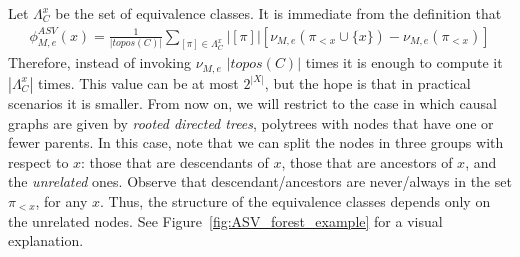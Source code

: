 \newcommand{\equivalenceClasses}{\Lambda_C^x}

Let $\equivalenceClasses$ be the set of equivalence classes. It is immediate from the definition that
%
\begin{align}\label{eq:equivalence_classes_into_shap}
	\phi^{ASV}_{M,e} (x) = \frac{1}{|topos(C)|} \sum_{[\pi] \in \equivalenceClasses} |[\pi]| \left[ \nu_{M,e}(\pi_{<x} \cup \{x\}) - \nu_{M,e}(\pi_{<x}) \right]
\end{align}
%
Therefore, instead of invoking $\nu_{M,e}$ $|topos(C)|$ times it is enough to compute it $|\equivalenceClasses|$ times. This value can be at most $2^{|X|}$, but the hope is that in practical scenarios it is smaller. From now on, we will restrict to the case in which causal graphs are given 
by \textit{rooted directed trees}, polytrees with nodes that have one or fewer parents. In this case, note that we can split the nodes in three groups with respect to $x$: those that are descendants of $x$, those that are ancestors of $x$, and the \textit{unrelated} ones. Observe that descendant/ancestors are never/always in the set $\pi_{<x}$, for any $x$. Thus, the structure of the equivalence classes depends only on the unrelated nodes. See Figure~\ref{fig:ASV_forest_example} for a visual explanation.



